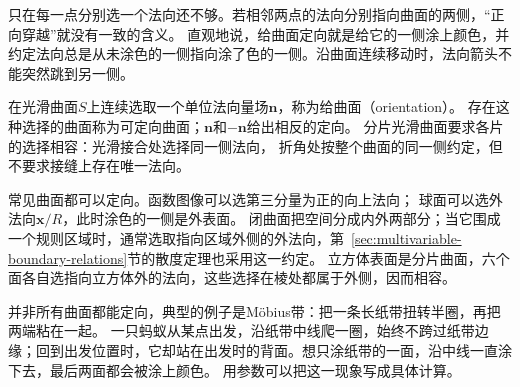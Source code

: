 只在每一点分别选一个法向还不够。若相邻两点的法向分别指向曲面的两侧，“正向穿越”就没有一致的含义。
直观地说，给曲面定向就是给它的一侧涂上颜色，并约定法向总是从未涂色的一侧指向涂了色的一侧。沿曲面连续移动时，法向箭头不能突然跳到另一侧。

\begin{definition}[曲面的定向]
\label{def:analysis-surface-orientation}
在光滑曲面$S$上连续选取一个单位法向量场$\bm n$，称为给曲面（orientation）。
存在这种选择的曲面称为可定向曲面；$\bm n$和$-\bm n$给出相反的定向。
分片光滑曲面要求各片的选择相容：光滑接合处选择同一侧法向，
折角处按整个曲面的同一侧约定，但不要求接缝上存在唯一法向。
\end{definition}

常见曲面都可以定向。函数图像可以选第三分量为正的向上法向；
球面可以选外法向$\bm x/R$，此时涂色的一侧是外表面。
闭曲面把空间分成内外两部分；当它围成一个规则区域时，通常选取指向区域外侧的外法向，第~\ref{sec:multivariable-boundary-relations}节的散度定理也采用这一约定。
立方体表面是分片曲面，六个面各自选指向立方体外的法向，这些选择在棱处都属于外侧，因而相容。

并非所有曲面都能定向，典型的例子是Möbius带：把一条长纸带扭转半圈，再把两端粘在一起。
一只蚂蚁从某点出发，沿纸带中线爬一圈，始终不跨过纸带边缘；回到出发位置时，它却站在出发时的背面。想只涂纸带的一面，沿中线一直涂下去，最后两面都会被涂上颜色。
用参数可以把这一现象写成具体计算。

